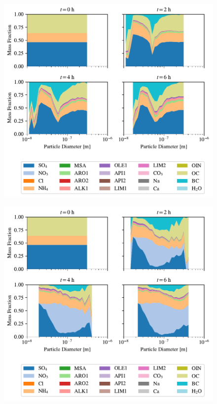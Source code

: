 \begin{figure}[!t]
  \centering
    \includegraphics[width=\textwidth]{figures/chapter5/speciated-mass-frac-four-panel-uniform-basecase-z40.pdf}
    \caption{}
\end{figure}

\begin{figure}[!t]
  \centering
    \includegraphics[width=\textwidth]{figures/chapter5/speciated-mass-frac-four-panel-point-source-1x1-z40.pdf}
    \caption{}
\end{figure}


